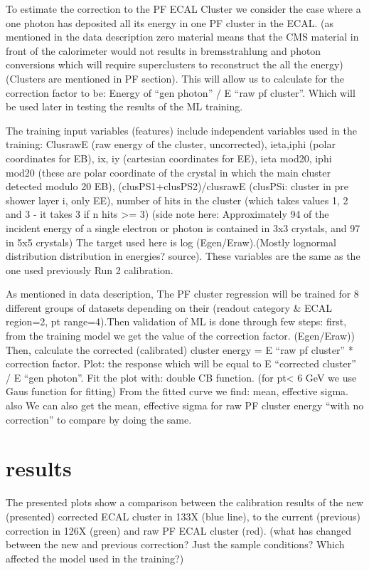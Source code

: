 To estimate the correction to the PF ECAL Cluster we consider the case where a one photon has deposited all its energy in one PF cluster in the ECAL.  (as mentioned in the data description zero material means that the CMS material in front of the calorimeter would not results in bremsstrahlung and photon conversions which will require superclusters to reconstruct the all the energy) (Clusters are mentioned in PF section). This will allow us to calculate for the correction factor to be: Energy of “gen photon” / E “raw pf cluster”. Which will be used later in testing the results of the ML training.

The training input variables (features) include independent variables used in the training:   
ClusrawE (raw energy of the cluster, uncorrected), 
ieta,iphi (polar coordinates for EB), 
ix, iy (cartesian coordinates for EE), 
ieta mod20, iphi mod20 (these are polar coordinate of the crystal in which the main cluster detected modulo 20 EB), 
(clusPS1+clusPS2)/clusrawE (clusPSi: cluster in pre shower layer i, only EE),   
number of hits in the cluster (which takes values 1, 2 and 3 - it takes 3 if n hits >= 3) (side note here: Approximately 94 of the incident energy of a single electron or photon is contained in 3x3 crystals, and 97 in 5x5 crystals) %
The target used here is log (Egen/Eraw).(Mostly lognormal distribution distribution in energies? source). These variables are the same as the one used previously Run 2 calibration. 

As mentioned in data description, The PF cluster regression will be trained for 8 different groups of datasets depending on their (readout category & ECAL region=2, pt range=4).Then validation of ML is done through few steps:  
first, from the training model we get the value of the correction factor. (Egen/Eraw)) 
Then, calculate the corrected (calibrated) cluster energy = E “raw pf cluster” * correction factor.  
Plot: the response which will be equal to E “corrected cluster” / E “gen photon”. 
Fit the plot with: double CB function. (for pt< 6 GeV we use Gaus function for fitting) 
From the fitted curve we find: mean, effective sigma. also We can also get the mean, effective sigma for raw PF cluster energy “with no correction” to compare by doing the same. 

\section{results}

The presented plots show a comparison between the calibration results of the new (presented) corrected ECAL cluster in 133X (blue line), to the current (previous) correction in 126X (green) and raw PF ECAL cluster (red). (what has changed between the new and previous correction? Just the sample conditions? Which affected the model used in the training?)  

